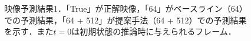 \documentclass[10pt, twocolumn]{jarticle}
\begin{document}
\begin{figure}[tp]
{    \label{fig:pred_b}}
    \caption[映像予測結果1]{映像予測結果1．「True」が正解映像，「64」がベースライン（64）での予測結果，「64 + 512」が提案手法（64 + 512）での予測結果を示す．また$t = 0$は初期状態の推論時に与えられるフレーム．}
    \label{fig:compare_ab}
\end{figure}

\begin{figure}[tp]
    \centering
    \\
\end{figure}
\end{document}
